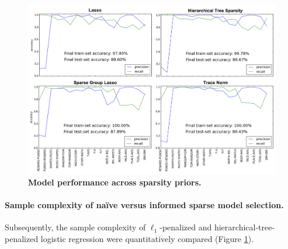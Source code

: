 \documentclass{article} %
\begin{document}
\begin{figure}
\begin{centering}
\includegraphics[width=1.00\textwidth]{figures/sparsities.pdf}
\end{centering}
\vspace{-0.6cm}
\caption{\textbf{Model performance across sparsity priors.}
}
\label{fig_sparsities}
\end{figure}


\paragraph{Sample complexity of na\"ive versus informed sparse model selection.}
Subsequently, the sample complexity of
$\ell_1$-penalized and hierarchical-tree-penalized logistic regression
were quantitatively compared (Figure \ref{fig_sparsities}).
\end{document}
